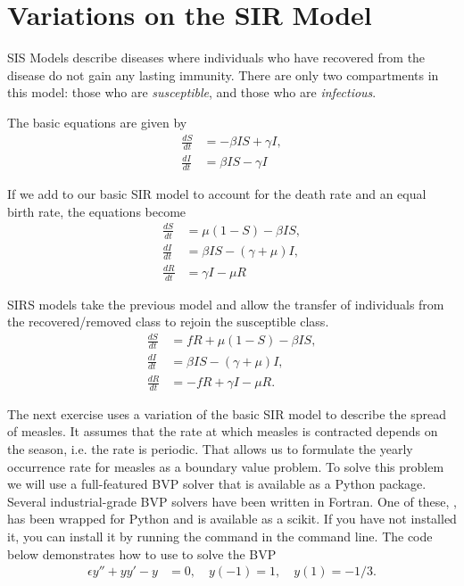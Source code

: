 \section*{Variations on the SIR Model}

SIS Models describe diseases where individuals who have recovered from the disease do not gain
any lasting immunity.
There are only two compartments in this model: those who are \emph{susceptible}, and those who are \emph{infectious}.

The basic equations are given by
\begin{align*}
\frac{dS}{dt} &=-\beta I S + \gamma I ,\\
\frac{dI}{dt} &= \beta I S-\gamma I
\end{align*}

If we add to our basic SIR model to account for the death rate and an equal birth rate, the equations become
\begin{align*}
\frac{dS}{dt} &=\mu(1 -S) - \beta I S,\\
\frac{dI}{dt} &= \beta I S - (\gamma + \mu)I, \\
\frac{dR}{dt} &= \gamma I - \mu R
\end{align*}

SIRS models take the previous model and allow the transfer of individuals from the recovered/removed class to rejoin the susceptible class.
\begin{align*}
\frac{dS}{dt} &= fR + \mu(1 -S) - \beta I S,\\
\frac{dI}{dt} &= \beta I S - (\gamma + \mu)I, \\
\frac{dR}{dt} &= -fR + \gamma I - \mu R.
\end{align*}

The next exercise uses a variation of the basic SIR model to describe the spread of measles.
It assumes that the rate at which measles is contracted depends on the season, i.e. the rate is periodic.
That allows us to formulate the yearly occurrence rate for measles as a boundary value problem.
To solve this problem we will use a full-featured BVP solver that is available as a Python package.
Several industrial-grade BVP solvers have been written in Fortran.
One of these, , has been wrapped for Python and is available as a scikit.
If you have not installed it, you can install it by running the command  in the command line.
The code below demonstrates how to use  to solve the BVP
\begin{align*}
	\epsilon y'' + yy' - y &= 0, \quad y(-1) = 1, \quad y(1) = -1/3.
\end{align*}


